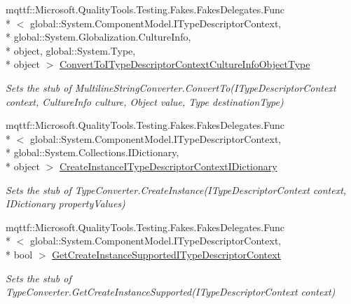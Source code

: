 \begin{DoxyCompactItemize}
mqttf\-::\-Microsoft.\-Quality\-Tools.\-Testing.\-Fakes.\-Fakes\-Delegates.\-Func\\*
$<$ global\-::\-System.\-Component\-Model.\-I\-Type\-Descriptor\-Context, \\*
global\-::\-System.\-Globalization.\-Culture\-Info, \\*
object, global\-::\-System.\-Type, \\*
object $>$ \hyperlink{class_system_1_1_component_model_1_1_fakes_1_1_stub_multiline_string_converter_a7e57879cf08de9791463194ce48db63a}{Convert\-To\-I\-Type\-Descriptor\-Context\-Culture\-Info\-Object\-Type}
\begin{DoxyCompactList}\small\item\em Sets the stub of Multiline\-String\-Converter.\-Convert\-To(\-I\-Type\-Descriptor\-Context context, Culture\-Info culture, Object value, Type destination\-Type)\end{DoxyCompactList}\item 
mqttf\-::\-Microsoft.\-Quality\-Tools.\-Testing.\-Fakes.\-Fakes\-Delegates.\-Func\\*
$<$ global\-::\-System.\-Component\-Model.\-I\-Type\-Descriptor\-Context, \\*
global\-::\-System.\-Collections.\-I\-Dictionary, \\*
object $>$ \hyperlink{class_system_1_1_component_model_1_1_fakes_1_1_stub_multiline_string_converter_a05660253066c01b4f6008d7a6bd816ee}{Create\-Instance\-I\-Type\-Descriptor\-Context\-I\-Dictionary}
\begin{DoxyCompactList}\small\item\em Sets the stub of Type\-Converter.\-Create\-Instance(\-I\-Type\-Descriptor\-Context context, I\-Dictionary property\-Values)\end{DoxyCompactList}\item 
mqttf\-::\-Microsoft.\-Quality\-Tools.\-Testing.\-Fakes.\-Fakes\-Delegates.\-Func\\*
$<$ global\-::\-System.\-Component\-Model.\-I\-Type\-Descriptor\-Context, \\*
bool $>$ \hyperlink{class_system_1_1_component_model_1_1_fakes_1_1_stub_multiline_string_converter_ae4426eae317af43ec89548451fffc80d}{Get\-Create\-Instance\-Supported\-I\-Type\-Descriptor\-Context}
\begin{DoxyCompactList}\small\item\em Sets the stub of Type\-Converter.\-Get\-Create\-Instance\-Supported(\-I\-Type\-Descriptor\-Context context)\end{DoxyCompactList}\item 

\end{DoxyCompactItemize}
